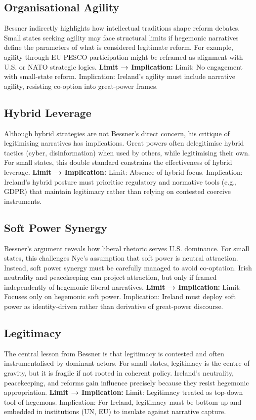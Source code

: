 \subsection*{Organisational Agility}
Bessner indirectly highlights how intellectual traditions shape reform debates. Small states seeking agility may face structural limits if hegemonic narratives define the parameters of what is considered legitimate reform. For example, agility through EU PESCO participation might be reframed as alignment with U.S. or NATO strategic logics.  
\textbf{Limit → Implication:} Limit: No engagement with small-state reform. Implication: Ireland’s agility must include narrative agility, resisting co-option into great-power frames.

\subsection*{Hybrid Leverage}
Although hybrid strategies are not Bessner’s direct concern, his critique of legitimising narratives has implications. Great powers often delegitimise hybrid tactics (cyber, disinformation) when used by others, while legitimising their own. For small states, this double standard constrains the effectiveness of hybrid leverage.  
\textbf{Limit → Implication:} Limit: Absence of hybrid focus. Implication: Ireland’s hybrid posture must prioritise regulatory and normative tools (e.g., GDPR) that maintain legitimacy rather than relying on contested coercive instruments.

\subsection*{Soft Power Synergy}
Bessner’s argument reveals how liberal rhetoric serves U.S. dominance. For small states, this challenges Nye’s assumption that soft power is neutral attraction. Instead, soft power synergy must be carefully managed to avoid co-optation. Irish neutrality and peacekeeping can project attraction, but only if framed independently of hegemonic liberal narratives.  
\textbf{Limit → Implication:} Limit: Focuses only on hegemonic soft power. Implication: Ireland must deploy soft power as identity-driven rather than derivative of great-power discourse.

\subsection*{Legitimacy}
The central lesson from Bessner is that legitimacy is contested and often instrumentalised by dominant actors. For small states, legitimacy is the centre of gravity, but it is fragile if not rooted in coherent policy. Ireland’s neutrality, peacekeeping, and reforms gain influence precisely because they resist hegemonic appropriation.  
\textbf{Limit → Implication:} Limit: Legitimacy treated as top-down tool of hegemons. Implication: For Ireland, legitimacy must be bottom-up and embedded in institutions (UN, EU) to insulate against narrative capture.

